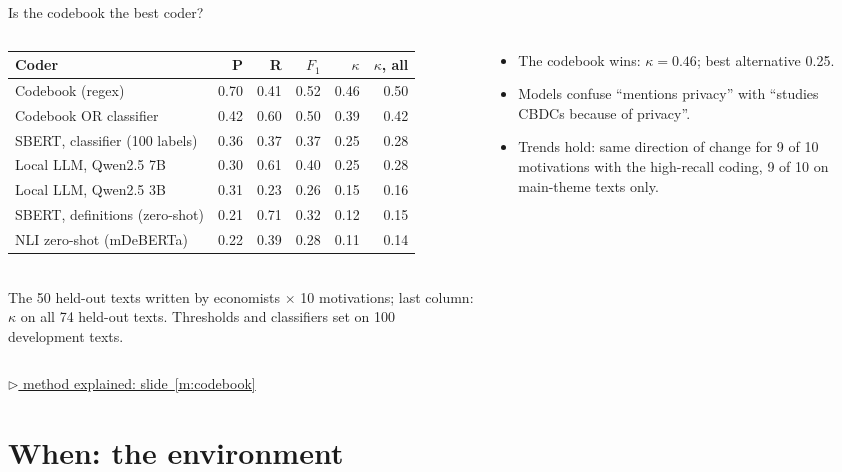 \documentclass[aspectratio=169,10pt]{beamer}
\newcommand{\method}[1]{\hfill\hyperref[#1]{\tiny\textcolor{c4}{$\triangleright$ method explained: slide~\ref*{#1}}}}
\begin{document}
\begin{frame}{Is the codebook the best coder?}
\begin{columns}[T]
\begin{column}{0.58\textwidth}\scriptsize
\begin{tabular}{@{}lrrrrr@{}}\toprule
\textbf{Coder} & \textbf{P} & \textbf{R} & $F_1$ & $\kappa$ & $\kappa$\textbf{, all}\\\midrule
\rowcolor{c4!12}Codebook (regex) & 0.70 & 0.41 & 0.52 & 0.46 & 0.50 \\
Codebook OR classifier & 0.42 & 0.60 & 0.50 & 0.39 & 0.42 \\
SBERT, classifier (100 labels) & 0.36 & 0.37 & 0.37 & 0.25 & 0.28 \\
Local LLM, Qwen2.5 7B & 0.30 & 0.61 & 0.40 & 0.25 & 0.28 \\
Local LLM, Qwen2.5 3B & 0.31 & 0.23 & 0.26 & 0.15 & 0.16 \\
SBERT, definitions (zero-shot) & 0.21 & 0.71 & 0.32 & 0.12 & 0.15 \\
NLI zero-shot (mDeBERTa) & 0.22 & 0.39 & 0.28 & 0.11 & 0.14 \\
\bottomrule\end{tabular}\\[3pt]
The 50 held-out texts written by economists $\times$ 10 motivations; last column: $\kappa$ on all 74 held-out texts. Thresholds and classifiers set on 100 development texts.
\end{column}
\begin{column}{0.4\textwidth}\small
\begin{itemize}\setlength\itemsep{2pt}
\item \alert{The codebook wins}: $\kappa = 0.46$; best alternative 0.25.
\item Models confuse ``mentions privacy'' with ``studies CBDCs because of privacy''.
\item Trends hold: same direction of change for 9 of 10 motivations with the high-recall coding, 9 of 10 on main-theme texts only.
\end{itemize}
\end{column}
\end{columns}
\method{m:codebook}
\end{frame}

\section{When: the environment}
\end{document}
